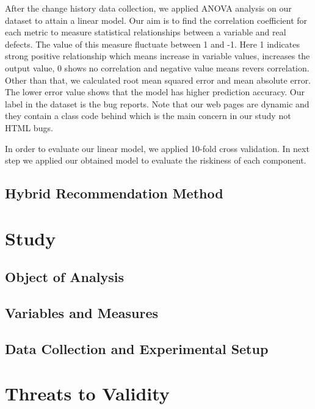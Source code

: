 After the change history data collection, we applied ANOVA analysis on our dataset to attain a linear model.
Our aim is to find the correlation coefficient for each metric to measure statistical relationships between 
a variable and real defects. The value of this measure fluctuate between 1 and -1. Here 1 indicates strong 
positive relationship which means increase in variable values, increases the output value, 0 shows no correlation 
and negative value means revers correlation. 
Other than that, we calculated root mean squared error and mean absolute error. 
The lower error value shows that the model has higher prediction accuracy. 
Our label in the dataset is the bug reports. Note that our web pages are 
dynamic and they contain a class code behind which is the main concern in our study not HTML bugs. 

In order to evaluate our linear model, we applied 10-fold cross validation. 
In next step we applied our obtained model to evaluate the riskiness of each component. 

\subsection{Hybrid Recommendation Method}



\section{Study}
\subsection{Object of Analysis}
\subsection{Variables and Measures}
\subsection{Data Collection and Experimental Setup}

\section{Threats to Validity}
\label{sec:validity}


